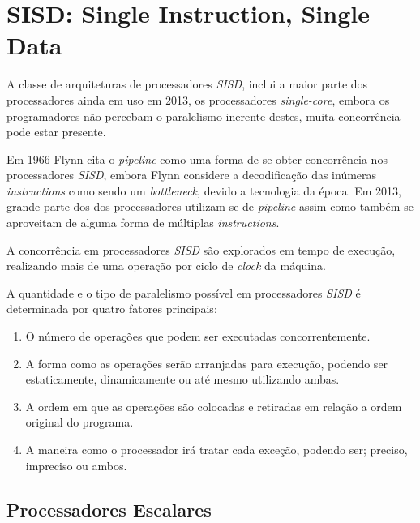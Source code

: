 \section{SISD: Single Instruction, Single Data}

A classe de arquiteturas de processadores \textit{SISD}, inclui a 
maior parte dos processadores ainda em uso em 2013, os processadores 
\textit{single-core}, embora os programadores não percebam o paralelismo 
inerente destes, muita concorrência pode estar presente.  

Em 1966 Flynn cita o \textit{pipeline} como uma forma de se obter concorrência 
nos processadores \textit{SISD}, embora Flynn considere a decodificação das 
inúmeras \textit{instructions} como sendo um \textit{bottleneck}, devido a 
tecnologia da época. 
Em 2013, grande parte dos dos processadores 
utilizam-se de \textit{pipeline} assim como também se aproveitam de alguma forma 
de múltiplas \textit{instructions}.

A concorrência em processadores \textit{SISD} são explorados em tempo de execução,
realizando mais de uma operação por ciclo de \textit{clock} da máquina.

A quantidade e o tipo de paralelismo possível em processadores \textit{SISD}
é determinada por quatro fatores principais:

\begin{enumerate}
        \item O número de operações que podem ser executadas concorrentemente.
        \item A forma como as operações serão arranjadas para execução,
                podendo ser estaticamente, dinamicamente ou até mesmo utilizando
                ambas.
        \item A ordem em que as operações são colocadas e retiradas em relação
                a ordem original do programa.
        \item A maneira como o processador irá tratar cada exceção, podendo ser; 
                preciso, impreciso ou ambos.
\end{enumerate}

\subsection{Processadores Escalares}

